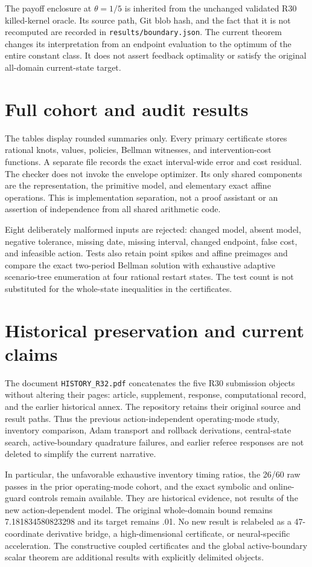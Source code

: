 The payoff enclosure at $\theta=1/5$ is inherited from the unchanged validated R30 killed-kernel oracle. Its source path, Git blob hash, and the fact that it is not recomputed are recorded in \texttt{results/boundary.json}. The current theorem changes its interpretation from an endpoint evaluation to the optimum of the entire constant class. It does not assert feedback optimality or satisfy the original all-domain current-state target.

\section{Full cohort and audit results}

The tables display rounded summaries only. Every primary certificate stores rational knots, values, policies, Bellman witnesses, and intervention-cost functions. A separate file records the exact interval-wide error and cost residual. The checker does not invoke the envelope optimizer. Its only shared components are the representation, the primitive model, and elementary exact affine operations. This is implementation separation, not a proof assistant or an assertion of independence from all shared arithmetic code.

Eight deliberately malformed inputs are rejected: changed model, absent model, negative tolerance, missing date, missing interval, changed endpoint, false cost, and infeasible action. Tests also retain point spikes and affine preimages and compare the exact two-period Bellman solution with exhaustive adaptive scenario-tree enumeration at four rational restart states. The test count is not substituted for the whole-state inequalities in the certificates.

\section{Historical preservation and current claims}
The document \texttt{HISTORY\_R32.pdf} concatenates the five R30 submission objects without altering their pages: article, supplement, response, computational record, and the earlier historical annex. The repository retains their original source and result paths. Thus the previous action-independent operating-mode study, inventory comparison, Adam transport and rollback derivations, central-state search, active-boundary quadrature failures, and earlier referee responses are not deleted to simplify the current narrative.

In particular, the unfavorable exhaustive inventory timing ratios, the 26/60 raw passes in the prior operating-mode cohort, and the exact symbolic and online-guard controls remain available. They are historical evidence, not results of the new action-dependent model. The original whole-domain bound remains 7.181834580823298 and its target remains .01. No new result is relabeled as a 47-coordinate derivative bridge, a high-dimensional certificate, or neural-specific acceleration. The constructive coupled certificates and the global active-boundary scalar theorem are additional results with explicitly delimited objects.
